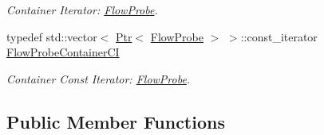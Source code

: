 \begin{DoxyCompactItemize}
\begin{DoxyCompactList}\small\item\em Container Iterator\+: \hyperlink{classns3_1_1FlowProbe}{Flow\+Probe}. \end{DoxyCompactList}\item 
typedef std\+::vector$<$ \hyperlink{classns3_1_1Ptr}{Ptr}$<$ \hyperlink{classns3_1_1FlowProbe}{Flow\+Probe} $>$ $>$\+::const\+\_\+iterator \hyperlink{classns3_1_1FlowMonitor_aa035a998de5554f6925692bc9588690f}{Flow\+Probe\+Container\+CI}
\begin{DoxyCompactList}\small\item\em Container Const Iterator\+: \hyperlink{classns3_1_1FlowProbe}{Flow\+Probe}. \end{DoxyCompactList}\end{DoxyCompactItemize}
\subsection*{Public Member Functions}
